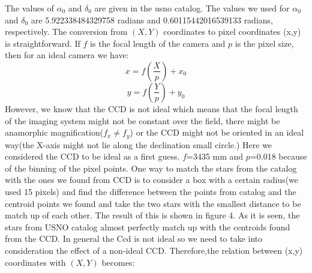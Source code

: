 \documentclass[letterpaper,12pt]{article}
\begin{document}
The values of \begin{math} \alpha_{0} \end{math} and \begin{math} \delta_{0} \end{math} are given in the usno catalog.
The values we used for  \begin{math} \alpha_{0} \end{math} and \begin{math} \delta_{0} \end{math} are  5.922338484329758 radians and 0.60115442016539133 radians, respectively. 
The conversion from \begin{math}(X,Y) \end{math} coordinates to pixel coordinates (x,y) is straightforward. If \begin{math} f \end{math} is the focal length of the camera and \begin{math} p \end{math} is the pixel size, then for an ideal camera we have:
\begin{equation}
x=f(\frac{X}{p})+x_{0}
\end{equation}
\begin{equation}
y=f(\frac{Y}{p})+y_{0}
\end{equation}
However, we know that the CCD is not ideal which means that the focal length of the imaging system might not be constant over the field, there might be anamorphic magnification(\begin{math} f_{x}\neq f_{y} \end{math}) or the CCD might not be oriented in an ideal way(the X-axis might not lie along the declination small circle.)
Here we considered the CCD to be ideal as a first guess. \begin{math} f \end{math}=3435 mm and \begin{math} p \end{math}=0.018 because of the binning of the pixel points. One way to match the stars from the catalog with the ones we found from CCD is to consider a box with a certain radius(we used 15 pixels) and find the difference between the points from catalog and the centroid points we found and take the two stars with the smallest distance to be match up of each other. The result of this is shown in figure 4. As it is seen, the stars from USNO catalog almost perfectly match up with the centroids found from the CCD. 
In general the Ccd is not ideal so we need to take into consideration the effect of a non-ideal CCD. Therefore,the relation between (x,y) coordinates with  \begin{math} (X,Y) \end{math} becomes:
\end{document}
